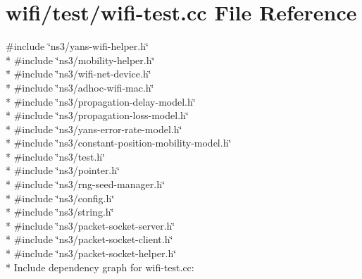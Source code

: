 \hypertarget{wifi-test_8cc}{}\section{wifi/test/wifi-\/test.cc File Reference}
\label{wifi-test_8cc}
{\ttfamily \#include \char`\"{}ns3/yans-\/wifi-\/helper.\+h\char`\"{}}\\*
{\ttfamily \#include \char`\"{}ns3/mobility-\/helper.\+h\char`\"{}}\\*
{\ttfamily \#include \char`\"{}ns3/wifi-\/net-\/device.\+h\char`\"{}}\\*
{\ttfamily \#include \char`\"{}ns3/adhoc-\/wifi-\/mac.\+h\char`\"{}}\\*
{\ttfamily \#include \char`\"{}ns3/propagation-\/delay-\/model.\+h\char`\"{}}\\*
{\ttfamily \#include \char`\"{}ns3/propagation-\/loss-\/model.\+h\char`\"{}}\\*
{\ttfamily \#include \char`\"{}ns3/yans-\/error-\/rate-\/model.\+h\char`\"{}}\\*
{\ttfamily \#include \char`\"{}ns3/constant-\/position-\/mobility-\/model.\+h\char`\"{}}\\*
{\ttfamily \#include \char`\"{}ns3/test.\+h\char`\"{}}\\*
{\ttfamily \#include \char`\"{}ns3/pointer.\+h\char`\"{}}\\*
{\ttfamily \#include \char`\"{}ns3/rng-\/seed-\/manager.\+h\char`\"{}}\\*
{\ttfamily \#include \char`\"{}ns3/config.\+h\char`\"{}}\\*
{\ttfamily \#include \char`\"{}ns3/string.\+h\char`\"{}}\\*
{\ttfamily \#include \char`\"{}ns3/packet-\/socket-\/server.\+h\char`\"{}}\\*
{\ttfamily \#include \char`\"{}ns3/packet-\/socket-\/client.\+h\char`\"{}}\\*
{\ttfamily \#include \char`\"{}ns3/packet-\/socket-\/helper.\+h\char`\"{}}\\*
Include dependency graph for wifi-\/test.cc\+:
